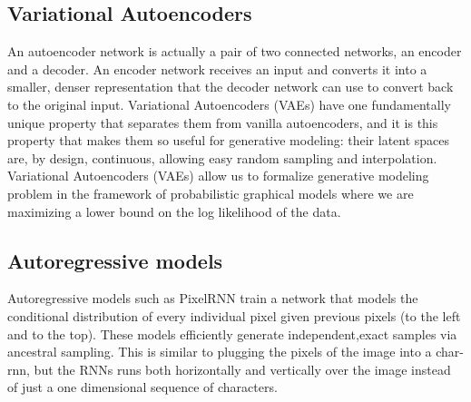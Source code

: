   \subsection{Variational Autoencoders } 
  \label{sub:vae}
  An autoencoder network is actually a pair of two connected networks, an encoder and a decoder. An encoder network receives an input and converts it into a smaller, denser representation that the decoder network can use to convert back to the original input. Variational Autoencoders (VAEs) have one fundamentally unique property that separates them from vanilla autoencoders, and it is this property that makes them so useful for generative modeling: their latent spaces are, by design, continuous, allowing easy random sampling and interpolation. Variational Autoencoders (VAEs) allow us to formalize generative modeling problem in the framework of probabilistic graphical models where we are maximizing a lower bound on the log likelihood of the data.
  \subsection{Autoregressive models} 
  \label{sub:autoregressive} 
  Autoregressive models such as PixelRNN train a network that models the conditional distribution of every individual pixel given previous pixels (to the left and to the top). These models efficiently generate independent,exact samples via ancestral sampling. This is similar to plugging the pixels of the image into a char-rnn, but the RNNs runs both horizontally and vertically over the image instead of just a one dimensional sequence of characters.\par\bigskip

